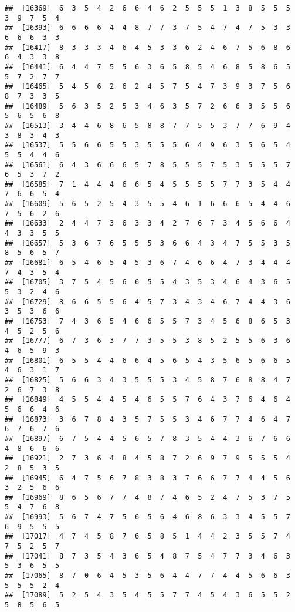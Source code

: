 \documentclass[
]{book}
\begin{document}
\begin{verbatim}
##  [16369]  6  3  5  4  2  6  6  4  6  2  5  5  5  1  3  8  5  5  5  3  9  7  5  4
##  [16393]  6  6  6  6  4  4  8  7  7  3  7  5  4  7  4  7  5  3  3  6  6  6  3  3
##  [16417]  8  3  3  3  4  6  4  5  3  3  6  2  4  6  7  5  6  8  6  6  4  3  3  8
##  [16441]  6  4  4  7  5  5  6  3  6  5  8  5  4  6  8  5  8  6  5  5  7  2  7  7
##  [16465]  5  4  5  6  2  6  2  4  5  7  5  4  7  3  9  3  7  5  6  8  7  3  3  5
##  [16489]  5  6  3  5  2  5  3  4  6  3  5  7  2  6  6  3  5  5  6  5  6  5  6  8
##  [16513]  3  4  4  6  8  6  5  8  8  7  7  5  5  3  7  7  6  9  4  3  8  3  4  3
##  [16537]  5  5  6  6  5  5  3  5  5  5  6  4  9  6  3  5  6  5  4  5  5  4  4  6
##  [16561]  6  4  3  6  6  6  5  7  8  5  5  5  7  5  3  5  5  5  7  6  5  3  7  2
##  [16585]  7  1  4  4  4  6  6  5  4  5  5  5  5  7  7  3  5  4  4  7  6  6  5  4
##  [16609]  5  6  5  2  5  4  3  5  5  4  6  1  6  6  6  5  4  4  6  7  5  6  2  6
##  [16633]  2  4  4  7  3  6  3  3  4  2  7  6  7  3  4  5  6  6  4  4  3  3  5  5
##  [16657]  5  3  6  7  6  5  5  5  3  6  6  4  3  4  7  5  5  3  5  8  5  6  5  7
##  [16681]  6  5  4  6  5  4  5  3  6  7  4  6  6  4  7  3  4  4  4  7  4  3  5  4
##  [16705]  3  7  5  4  5  6  6  5  5  4  3  5  3  4  6  4  3  6  5  5  3  2  4  6
##  [16729]  8  6  6  5  5  6  4  5  7  3  4  3  4  6  7  4  4  3  6  3  5  3  6  6
##  [16753]  7  4  3  6  5  4  6  6  5  5  7  3  4  5  6  8  6  5  3  4  5  2  5  6
##  [16777]  6  7  3  6  3  7  7  3  5  5  3  8  5  2  5  5  6  3  6  4  6  5  9  3
##  [16801]  6  5  5  4  4  6  6  4  5  6  5  4  3  5  6  5  6  6  5  4  6  3  1  7
##  [16825]  5  6  6  3  4  3  5  5  5  3  4  5  8  7  6  8  8  4  7  2  6  7  3  8
##  [16849]  4  5  5  4  4  5  4  6  5  5  7  6  4  3  7  6  4  6  4  5  6  6  4  6
##  [16873]  3  6  7  8  4  3  5  7  5  5  3  4  6  7  7  4  6  4  7  6  7  6  7  6
##  [16897]  6  7  5  4  4  5  6  5  7  8  3  5  4  4  3  6  7  6  6  4  8  6  6  6
##  [16921]  2  7  3  6  4  8  4  5  8  7  2  6  9  7  9  5  5  5  4  2  8  5  3  5
##  [16945]  6  4  7  5  6  7  8  3  8  3  7  6  6  7  7  4  4  5  6  3  2  5  6  6
##  [16969]  8  6  5  6  7  7  4  8  7  4  6  5  2  4  7  5  3  7  5  5  4  7  6  8
##  [16993]  5  6  7  4  7  5  6  5  6  4  6  8  6  3  3  4  5  5  7  6  9  5  5  5
##  [17017]  4  7  4  5  8  7  6  5  8  5  1  4  4  2  3  5  5  7  4  7  5  2  5  7
##  [17041]  8  7  3  5  4  3  6  5  4  8  7  5  4  7  7  3  4  6  3  5  3  6  5  5
##  [17065]  8  7  0  6  4  5  3  5  6  4  4  7  7  4  4  5  6  6  3  5  5  5  2  4
##  [17089]  5  2  5  4  3  5  4  5  5  7  7  4  5  4  3  6  5  5  2  5  8  5  6  5

\end{verbatim}
\end{document}
